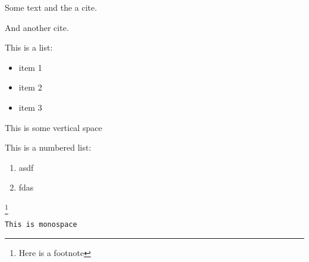 Some text and the a cite\cite{einstein}.

And another cite\cite{latexcompanion}.

This is a list:
\begin{itemize}
    \item item 1
    \item item 2
    \item item 3
\end{itemize}

This is some vertical space
\vspace{2cm}

This is a numbered list:
\begin{enumerate}
  \item asdf
  \item fdas
\end{enumerate}

\footnote{Here is a footnote}

\texttt{This is monospace}
\newline
\newpage